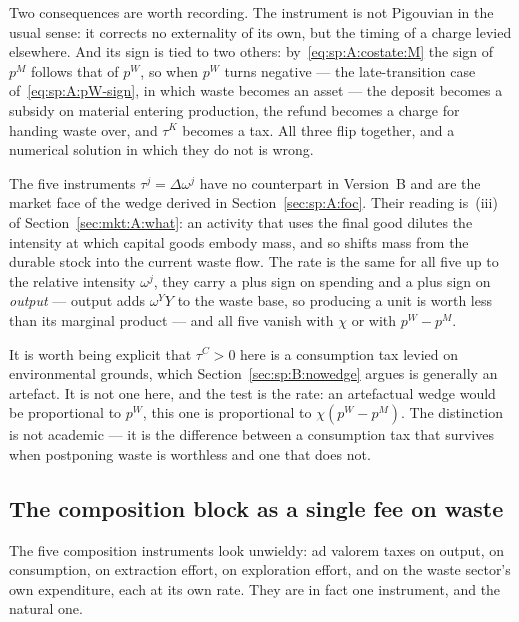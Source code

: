Two consequences are worth recording. The instrument is not Pigouvian in the usual sense: it corrects
no externality of its own, but the timing of a charge levied elsewhere. And its sign is tied to two
others: by~\eqref{eq:sp:A:costate:M} the sign of $p^M$ follows that of $p^W$, so when $p^W$ turns
negative --- the late-transition case of~\eqref{eq:sp:A:pW-sign}, in which waste becomes an asset ---
the deposit becomes a subsidy on material entering production, the refund becomes a charge for handing
waste over, and $\tau^K$ becomes a tax. All three flip together, and a numerical solution in which they
do not is wrong.

 The five instruments $\tau^j=\Delta\omega^j$ have no counterpart
in Version~B and are the market face of the wedge derived in Section~\ref{sec:sp:A:foc}. Their reading
is~(iii) of Section~\ref{sec:mkt:A:what}: an activity that uses the final good dilutes the intensity at
which capital goods embody mass, and so shifts mass from the durable stock into the current waste flow.
The rate is the same for all five up to the relative intensity $\omega^j$, they carry a plus sign on
spending and a plus sign on \emph{output} --- output adds $\omega^YY$ to the waste base, so producing a
unit is worth less than its marginal product --- and all five vanish with $\chi$ or with $p^W-p^M$.

It is worth being explicit that $\tau^C>0$ here is a consumption tax levied on environmental grounds,
which Section~\ref{sec:sp:B:nowedge} argues is generally an artefact. It is not one here, and the test
is the rate: an artefactual wedge would be proportional to $p^W$, this one is proportional to
$\chi\left(p^W-p^M\right)$. The distinction is not academic --- it is the difference between a
consumption tax that survives when postponing waste is worthless and one that does not.


\subsection{The composition block as a single fee on waste}\label{sec:mkt:A:gate}

The five composition instruments look unwieldy: ad valorem taxes on output, on consumption, on
extraction effort, on exploration effort, and on the waste sector's own expenditure, each at its own
rate. They are in fact one instrument, and the natural one.

